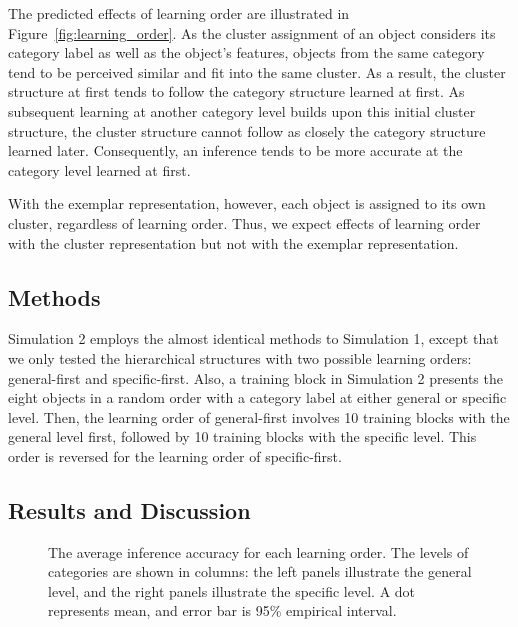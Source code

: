\documentclass[doc]{apa6}
\begin{document}
The predicted effects of learning order are illustrated in Figure~\ref{fig:learning_order}. As the
cluster assignment of an object considers its category label as well as the object's features,
objects from the same category tend to be perceived similar and fit into the same cluster. As a
result, the cluster structure at first tends to follow the category structure learned at first.
As subsequent learning at another category level builds upon this initial cluster structure, the
cluster structure cannot follow as closely the category structure learned later. Consequently, an
inference tends to be more accurate at the category level learned at first.

With the exemplar representation, however, each object is assigned to its own cluster, regardless of
learning order. Thus, we expect effects of learning order with the cluster representation but not
with the exemplar representation.


\subsection*{Methods}

Simulation 2 employs the almost identical methods to Simulation 1, except that we only tested the
hierarchical structures with two possible learning orders: general-first and specific-first. Also, a
training block in Simulation 2 presents the eight objects in a random order with a category label at
either general or specific level. Then, the learning order of general-first involves 10 training
blocks with the general level first, followed by 10 training blocks with the specific level. This
order is reversed for the learning order of specific-first.

\subsection*{Results and Discussion}

\begin{figure}[t!]
    \centering



    \vspace{10pt}

    \caption{The average inference accuracy for each learning order.  The levels of categories are
    shown in columns: the left panels illustrate the general level, and the right panels illustrate
    the specific level.   A dot represents mean, and error bar is 95\% empirical interval.}

\label{fig:result2}
\end{figure}
\end{document}
